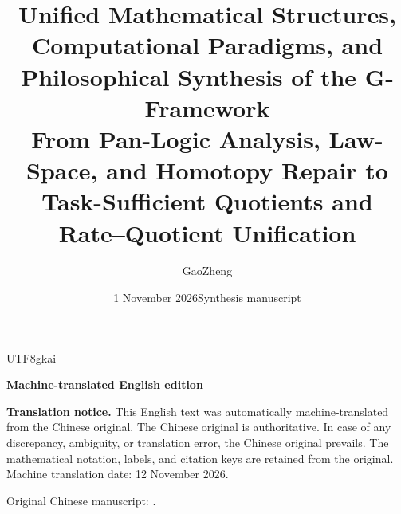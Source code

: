 \documentclass[11pt,a4paper]{article}
\title{\bfseries Unified Mathematical Structures, Computational Paradigms, and Philosophical Synthesis of the G-Framework\\[0.65em]\large From Pan-Logic Analysis, Law-Space, and Homotopy Repair to Task-Sufficient Quotients and Rate--Quotient Unification}
\author{GaoZheng}
\date{1 November 2026\quad Synthesis manuscript}
\theoremstyle{plain}
\theoremstyle{definition}
\theoremstyle{remark}
\begin{document}
\begin{CJK*}
{UTF8}{gkai}
\maketitle
\begin{center}\small\bfseries Machine-translated English edition\end{center}
\noindent\textbf{Translation notice.} This English text was automatically machine-translated from the Chinese original. The Chinese original is authoritative. In case of any discrepancy, ambiguity, or translation error, the Chinese original prevails. The mathematical notation, labels, and citation keys are retained from the original. Machine translation date: 12 November 2026.\par
\noindent Original Chinese manuscript: .\par\medskip


\end{CJK*}
\end{document}
